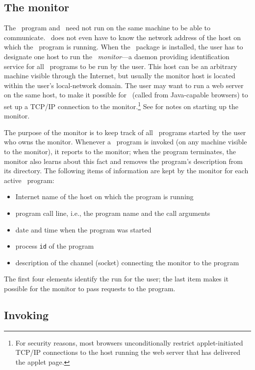 \subsection{The monitor}
\label{rm_ds_mo}

The \smurph\ program and \dsd\ need not run on the same machine to be able
to communicate.
\dsd\ does not even have to know the network address of the host on which the
\smurph\ program is running.
When the \smurph\ package is installed, the user has to designate one
host to run the \smurph\ {\em monitor\/}---a daemon providing
identification service for all \smurph\ programs to be run by the user.
This host can be an arbitrary machine visible through the Internet, but
usually the monitor host is located within the user's local-network domain.
The user may want to run a web server on the same host, to make it possible
for \dsd\ (called from Java-capable browsers) to set up a TCP/IP
connection to the monitor.\footnote{For security reasons,
most browsers unconditionally restrict applet-initiated
TCP/IP connections to the host running the web server that has delivered
the applet page.}
See  for notes on starting up the monitor.

The purpose of the monitor is to keep track of all \smurph\ programs
started by the user who owns the monitor.
Whenever a \smurph\ program
is invoked (on any machine visible to the monitor),
it reports to the monitor;
when the program terminates, the monitor also learns about
this fact and removes the program's description from its directory.
The following items of information are kept by the monitor
for each active \smurph\ program:
\begin{itemize}
\item
Internet
name of the host on which the program is running
\item
program call line, i.e., the program name and the call arguments
\item
date and time when the program was started
\item
process {\tt id} of the program
\item
description of the channel (socket) connecting the monitor to the program
\end{itemize}

The first four elements identify the run for the user;
the last item makes it possible for the monitor to pass requests to
the program.

\subsection{Invoking \dsd}
\label{rm_ds_li}

